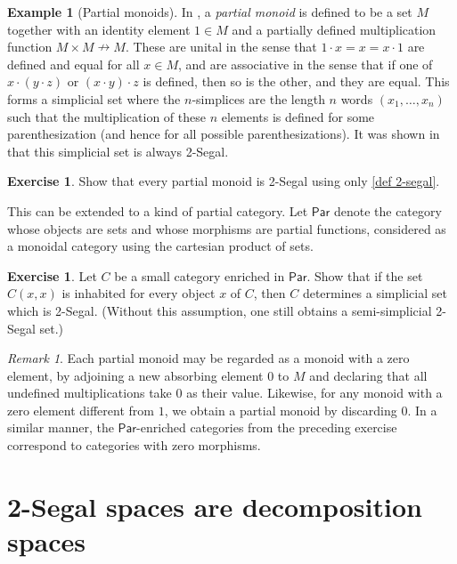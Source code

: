 \documentclass{amsart}
\theoremstyle{definition}
\newtheorem{example}[theorem]{Example}
\newtheorem{exercise}[theorem]{Exercise}
\theoremstyle{remark}
\newtheorem{remark}[theorem]{Remark}
\newcommand{\catpar}{\mathsf{Par}}
\newcommand{\phnote}[1]{\todo[color=purple!40,linecolor=purple!40!black,size=\tiny]{#1}}
\begin{document}
\begin{example}[Partial monoids]\label{ex partial monoid} In \cite[\S2]{Segal:CSILS}, a \emph{partial monoid} is defined to be a set $M$ together with an identity element $1\in M$ and a partially defined multiplication function $M \times M \nrightarrow M$.
These are unital in the sense that $1\cdot x = x = x \cdot 1$ are defined and equal for all $x\in M$, and are associative in the sense that if one of $x \cdot (y \cdot z)$ or $(x \cdot y) \cdot z$ is defined, then so is the other, and they are equal.
This forms a simplicial set where the $n$-simplices are the length $n$ words $(x_1, \dots, x_n)$ such that the multiplication of these $n$ elements is defined for some parenthesization (and hence for all possible parenthesizations). 
It was shown in \cite[Example 2.1]{BOORS:2SSWC} that this simplicial set is always 2-Segal.
\end{example}

\begin{exercise}
Show that every partial monoid is 2-Segal using only \cref{def 2-segal}.
\end{exercise}

This can be extended to a kind of partial category. %
Let $\catpar$ denote the category whose objects are sets and whose morphisms are partial functions, considered as a monoidal category using the cartesian product of sets.
\phnote{Consider removing partial categories.}

\begin{exercise}
Let $C$ be a small category enriched in $\catpar$.
Show that if the set $C(x,x)$ is inhabited for every object $x$ of $C$, then $C$ determines a simplicial set which is 2-Segal.
(Without this assumption, one still obtains a semi-simplicial 2-Segal set.) 
\end{exercise}

\begin{remark}
Each partial monoid may be regarded as a monoid with a zero element, by adjoining a new absorbing element $0$ to $M$ and declaring that all undefined multiplications take $0$ as their value.
Likewise, for any monoid with a zero element different from $1$, we obtain a partial monoid by discarding $0$.
In a similar manner, the $\catpar$-enriched categories from the preceding exercise correspond to categories with zero morphisms. %
\end{remark}

\section{2-Segal spaces are decomposition spaces}\label{sec 2-Segl decomp}
\end{document}

